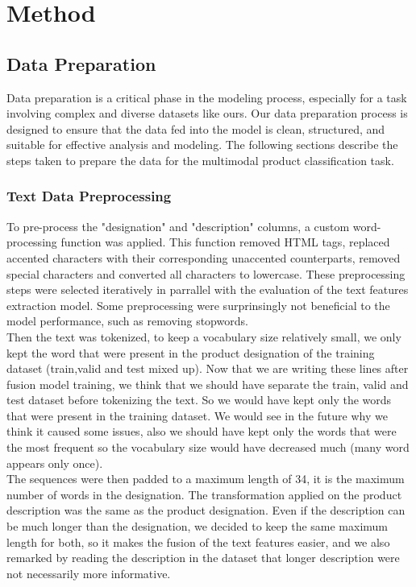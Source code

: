 \chapter{Method}
\label{sec:method}

\section{Data Preparation}
Data preparation is a critical phase in the modeling process, especially for a task involving complex and diverse datasets like ours. Our data preparation process is designed to ensure that the data fed into the model is clean, structured, and suitable for effective analysis and modeling. The following sections describe the steps taken to prepare the data for the multimodal product classification task.

\subsection{Text Data Preprocessing}

To pre-process the "designation" and "description" columns, a custom word-processing function was applied. This function removed HTML tags, replaced accented characters with their corresponding unaccented counterparts, removed special characters and converted all characters to lowercase. These preprocessing steps were selected iteratively in parrallel with the evaluation of the text features extraction model. Some preprocessing were surprinsingly not beneficial to the model performance, such as removing stopwords.\\

Then the text was tokenized, to keep a vocabulary size relatively small, we only kept the word that were present in the product designation of the training dataset (train,valid and test mixed up).
Now that we are writing these lines after fusion model training, we think that we should have separate the train, valid and test dataset before tokenizing the text. So we would have kept only the words that were present in the training dataset. We would see in the future why we think it caused some issues, also we should have kept only the words that were the most frequent so the vocabulary size would have decreased much (many word appears only once).\\

The sequences were then padded to a maximum length of 34, it is the maximum number of words in the designation. The transformation applied on the product description was the same as the product designation. Even if the description can be much longer than the designation, we decided to keep the same maximum length for both, so it makes the fusion of the text features easier, and we also remarked by reading the description in the dataset that longer description were not necessarily more informative.\\


